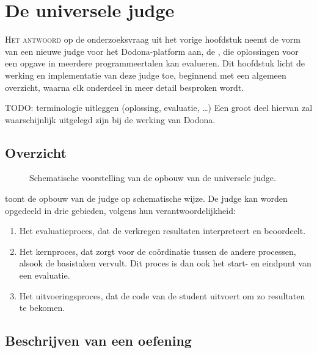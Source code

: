 \chapter{De universele judge}\label{ch:de-universele-judge}

\lettrine{H}{et antwoord} op de onderzoeksvraag uit het vorige hoofdstuk neemt de vorm van een nieuwe judge voor het Dodona-platform aan, de , die oplossingen voor een opgave in meerdere programmeertalen kan evalueren.
Dit hoofdstuk licht de werking en implementatie van deze judge toe, beginnend met een algemeen overzicht, waarna elk onderdeel in meer detail besproken wordt.

TODO: terminologie uitleggen (oplossing, evaluatie, \ldots)
Een groot deel hiervan zal waarschijnlijk uitgelegd zijn bij de werking van Dodona.

\section{Overzicht}\label{sec:overzicht}

\begin{figure}
    \begin{adjustbox}{width=\textwidth}
        
    \end{adjustbox}
    \caption{Schematische voorstelling van de opbouw van de universele judge.}
    \label{fig:universal-judge}
\end{figure}

 toont de opbouw van de judge op schematische wijze.
De judge kan worden opgedeeld in drie gebieden, volgens hun verantwoordelijkheid:

\begin{enumerate}
    \item Het evaluatieproces, dat de verkregen resultaten interpreteert en beoordeelt.
    \item Het kernproces, dat zorgt voor de coördinatie tussen de andere processen, alsook de basistaken vervult.
          Dit proces is dan ook het start- en eindpunt van een evaluatie.
    \item Het uitvoeringsproces, dat de code van de student uitvoert om zo resultaten te bekomen.
\end{enumerate}

\section{Beschrijven van een oefening}\label{sec:beschrijven-van-een-oefening}

